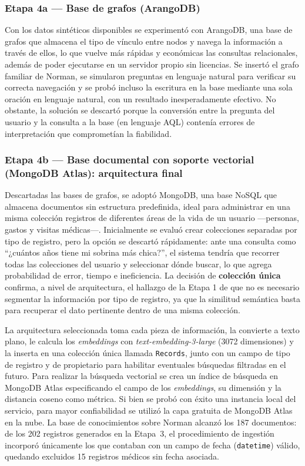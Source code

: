 \subsubsection{Etapa 4a --- Base de grafos (ArangoDB)}

Con los datos sintéticos disponibles se experimentó con ArangoDB, una base de grafos que almacena el tipo de vínculo entre nodos y navega la información a través de ellos, lo que vuelve más rápidas y económicas las consultas relacionales, además de poder ejecutarse en un servidor propio sin licencias. Se insertó el grafo familiar de Norman, se simularon preguntas en lenguaje natural para verificar su correcta navegación y se probó incluso la escritura en la base mediante una sola oración en lenguaje natural, con un resultado inesperadamente efectivo. No obstante, la solución se descartó porque la conversión entre la pregunta del usuario y la consulta a la base (en lenguaje AQL) contenía errores de interpretación que comprometían la fiabilidad.

\subsubsection{Etapa 4b --- Base documental con soporte vectorial (MongoDB Atlas): arquitectura final}

Descartadas las bases de grafos, se adoptó MongoDB, una base NoSQL que almacena documentos sin estructura predefinida, ideal para administrar en una misma colección registros de diferentes áreas de la vida de un usuario —personas, gastos y visitas médicas—. Inicialmente se evaluó crear colecciones separadas por tipo de registro, pero la opción se descartó rápidamente: ante una consulta como ``¿cuántos años tiene mi sobrina más chica?'', el sistema tendría que recorrer todas las colecciones del usuario y seleccionar dónde buscar, lo que agrega probabilidad de error, tiempo e ineficiencia. La decisión de \textbf{colección única} confirma, a nivel de arquitectura, el hallazgo de la Etapa 1 de que no es necesario segmentar la información por tipo de registro, ya que la similitud semántica basta para recuperar el dato pertinente dentro de una misma colección.

La arquitectura seleccionada toma cada pieza de información, la convierte a texto plano, le calcula los \textit{embeddings} con \textit{text-embedding-3-large} (3072 dimensiones) y la inserta en una colección única llamada \texttt{Records}, junto con un campo de tipo de registro y de propietario para habilitar eventuales búsquedas filtradas en el futuro. Para realizar la búsqueda vectorial se crea un índice de búsqueda en MongoDB Atlas especificando el campo de los \textit{embeddings}, su dimensión y la distancia coseno como métrica. Si bien se probó con éxito una instancia local del servicio, para mayor confiabilidad se utilizó la capa gratuita de MongoDB Atlas en la nube. La base de conocimientos sobre Norman alcanzó los 187 documentos: de los 202 registros generados en la Etapa~3, el procedimiento de ingestión incorporó únicamente los que contaban con un campo de fecha (\texttt{datetime}) válido, quedando excluidos 15 registros médicos sin fecha asociada.

